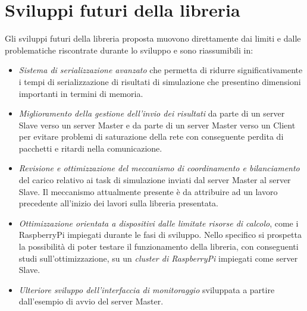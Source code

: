 \section{Sviluppi futuri della libreria}
Gli sviluppi futuri della libreria proposta muovono direttamente dai limiti e dalle problematiche riscontrate durante lo sviluppo e sono riassumibili in:

\begin{itemize}
    \item \emph{Sistema di serializzazione avanzato} che permetta di ridurre significativamente i tempi di serializzazione di risultati di simulazione che presentino dimensioni importanti in termini di memoria.
    \item \emph{Miglioramento della gestione dell'invio dei risultati} da parte di un server Slave verso un server Master e da parte di un server Master verso un Client per evitare problemi di saturazione della rete con conseguente perdita di pacchetti e ritardi nella comunicazione.
    \item \emph{Revisione e ottimizzazione del meccanismo di coordinamento e bilanciamento} del carico relativo ai task di simulazione inviati dal server Master al server Slave. Il meccanismo attualmente presente è da attribuire ad un lavoro precedente all'inizio dei lavori sulla libreria presentata.
    \item \emph{Ottimizzazione orientata a dispositivi dalle limitate risorse di calcolo}, come i RaspberryPi impiegati durante le fasi di sviluppo. Nello specifico si prospetta la possibilità di poter testare il funzionamento della libreria, con conseguenti studi sull'ottimizzazione, su un \emph{cluster di RaspberryPi} impiegati come server Slave.
    \item \emph{Ulteriore sviluppo dell'interfaccia di monitoraggio} sviluppata a partire dall'esempio di avvio del server Master.
\end{itemize}
